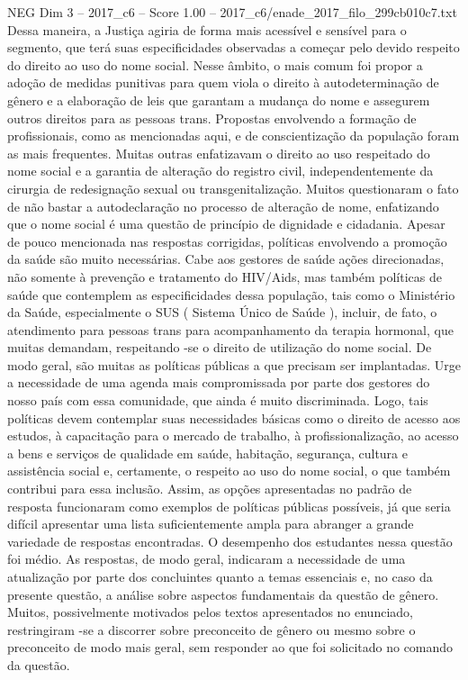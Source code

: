 \begin{textsample}{NEG Dim 3 – 2017\_c6 – Score 1.00 – 2017\_c6/enade\_2017\_filo\_299cb010c7.txt}
Dessa maneira, a Justiça agiria de forma mais acessível e sensível para o segmento, que terá suas especificidades observadas a começar pelo devido respeito do direito ao uso do nome social.
Nesse âmbito, o mais comum foi propor a adoção de medidas punitivas para quem viola o direito à autodeterminação de gênero e a elaboração de leis que garantam a mudança do nome e assegurem outros direitos para as pessoas trans.
Propostas envolvendo a formação de profissionais, como as mencionadas aqui, e de conscientização da população foram as mais frequentes.
Muitas outras enfatizavam o direito ao uso respeitado do nome social e a garantia de alteração do registro civil, independentemente da cirurgia de redesignação sexual ou transgenitalização.
Muitos questionaram o fato de não bastar a autodeclaração no processo de alteração de nome, enfatizando que o nome social é uma questão de princípio de dignidade e cidadania.
Apesar de pouco mencionada nas respostas corrigidas, políticas envolvendo a promoção da saúde são muito necessárias.
Cabe aos gestores de saúde ações direcionadas, não somente à prevenção e tratamento do HIV/Aids, mas também políticas de saúde que contemplem as especificidades dessa população, tais como o Ministério da Saúde, especialmente o SUS ( Sistema Único de Saúde ), incluir, de fato, o atendimento para pessoas trans para acompanhamento da terapia hormonal, que muitas demandam, respeitando -se o direito de utilização do nome social.
De modo geral, são muitas as políticas públicas a que precisam ser implantadas.
Urge a necessidade de uma agenda mais compromissada por parte dos gestores do nosso país com essa comunidade, que ainda é muito discriminada.
Logo, tais políticas devem contemplar suas necessidades básicas como o direito de acesso aos estudos, à capacitação para o mercado de trabalho, à profissionalização, ao acesso a bens e serviços de qualidade em saúde, habitação, segurança, cultura e assistência social e, certamente, o respeito ao uso do nome social, o que também contribui para essa inclusão.
Assim, as opções apresentadas no padrão de resposta funcionaram como exemplos de políticas públicas possíveis, já que seria difícil apresentar uma lista suficientemente ampla para abranger a grande variedade de respostas encontradas.
O desempenho dos estudantes nessa questão foi médio.
As respostas, de modo geral, indicaram a necessidade de uma atualização por parte dos concluintes quanto a temas essenciais e, no caso da presente questão, a análise sobre aspectos fundamentais da questão de gênero.
Muitos, possivelmente motivados pelos textos apresentados no enunciado, restringiram -se a discorrer sobre preconceito de gênero ou mesmo sobre o preconceito de modo mais geral, sem responder ao que foi solicitado no comando da questão.

\end{textsample}
